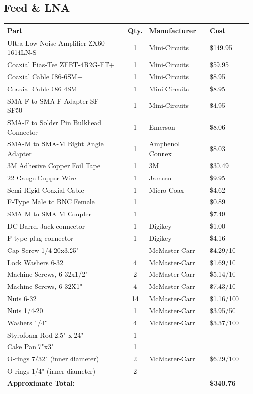 \documentclass[11pt]{article} %
\begin{document}
\subsection{Feed \& LNA}

\begin{tabular}{| p{6cm} | c | p{5cm} | l | c |}
\hline
\textbf{Part} & \textbf{Qty.} & \textbf{Manufacturer} & \textbf{Cost} \\ \hline \hline
Ultra Low Noise Amplifier ZX60-1614LN-S & 1 & Mini-Circuits & \$149.95 \\ \hline
Coaxial Bias-Tee ZFBT-4R2G-FT+& 1 & Mini-Circuits & \$59.95 \\ \hline
Coaxial Cable 086-6SM+ & 1 & Mini-Circuits & \$8.95 \\ \hline
Coaxial Cable 086-4SM+ & 1 & Mini-Circuits & \$8.95 \\ \hline
SMA-F to SMA-F Adapter SF-SF50+ & 1 & Mini-Circuits & \$4.95 \\ \hline
SMA-F to Solder Pin Bulkhead Connector & 1 & Emerson & \$8.06 \\ \hline
SMA-M to SMA-M Right Angle Adapter & 1 & Amphenol Connex & \$8.03 \\ \hline
3M Adhesive Copper Foil Tape & 1 & 3M & \$30.49 \\ \hline
22 Gauge Copper Wire & 1 & Jameco & \$9.95 \\ \hline
Semi-Rigid Coaxial Cable & 1 & Micro-Coax & \$4.62 \\ \hline
F-Type Male to BNC Female & 1 & & \$0.89 \\ \hline
SMA-M to SMA-M Coupler & 1 & & \$7.49\\ \hline
DC Barrel Jack connector & 1 & Digikey & \$1.00  \\ \hline
F-type plug connector & 1& Digikey & \$4.16  \\ \hline
Cap Screw 1/4-20x3.25" & & McMaster-Carr & \$4.29/10 \\ \hline 
Lock Washers 6-32 & 4 & McMaster-Carr & \$1.69/10 \\ \hline
Machine Screws, 6-32x1/2" & 2 & McMaster-Carr & \$5.14/10 \\ \hline
Machine Screws, 6-32X1" & 4 & McMaster-Carr & \$7.43/10 \\ \hline
Nuts 6-32 & 14 & McMaster-Carr & \$1.16/100 \\ \hline
Nuts 1/4-20 & 1 & McMaster-Carr & \$3.95/50 \\ \hline
Washers 1/4" & 4 & McMaster-Carr & \$3.37/100 \\ \hline
Styrofoam Rod 2.5" x 24" & 1 & & \\ \hline
Cake Pan 7"x3" & 1 & & \\ \hline
O-rings 7/32" (inner diameter) & 2 & McMaster-Carr & \$6.29/100 \\ \hline
O-rings 1/4" (inner diameter) & 2 & & \\ \hline
\textbf{Approximate Total:} & & & \textbf{\$340.76} \\ \hline
\end{tabular}
\end{document}
